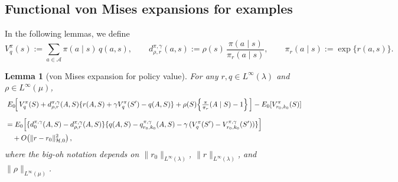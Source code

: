 \documentclass[11pt]{article}
\theoremstyle{plain}
\newtheorem{lemma}[theorem]{Lemma}
\begin{document}
\subsection{Functional von Mises expansions for examples}
 

 

 
 

In the following lemmas, we define
\[
V_q^\pi(s) := \sum_{a \in \mathcal{A}} \pi(a \mid s)\, q(a,s), \qquad d_{\rho,r}^{\pi,\gamma}(a,s) := \rho(s)\,\frac{\pi(a \mid s)}{\pi_r(a \mid s) },
\qquad 
\pi_r(a \mid s) := \exp\{r(a,s)\}.
\]

\begin{lemma}[von Mises expansion for policy value]
\label{lemma::vonmisespolicyvalue}
For any $r, q \in L^\infty(\lambda)$ and $\rho \in L^\infty(\mu)$,
\begin{align*}
&\; E_0\!\Big[\,V_q^\pi(S) 
   + d_{\rho,r}^{\pi,\gamma}(A,S)\{r(A,S) + \gamma V_q^\pi(S') - q(A,S)\}  
   + \rho(S)\Bigl\{\tfrac{\pi}{\pi_r}(A \mid S) - 1\Bigr\}\,\Big] - E_0[ V_{r_0, k_0}^\pi(S) ] \\[6pt]
&= E_0\!\left[\{d_0^{\pi,\gamma}(A,S) - d_{\rho,r}^{\pi,\gamma}(A,S)\}
   \{q(A,S) - q_{r_0,k_0}^{\pi,\gamma}(A,S) - \gamma\,(V_q^\pi(S') - V_{r_0,k_0}^{\pi,\gamma}(S'))\}\right] \\
&\quad + O\!\left(\|r - r_0\|^2_{\mathcal{H}, 0}\right),
\end{align*}
where the big-oh notation depends on $\|r_0\|_{L^\infty(\lambda)}$, $\|r\|_{L^\infty(\lambda)}$, and $\|\rho\|_{L^\infty(\mu)}$. 
\end{lemma}
\end{document}
